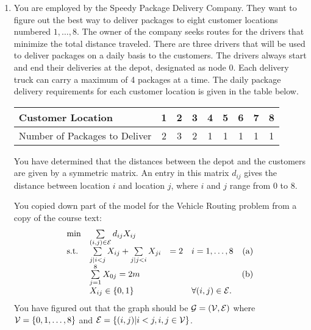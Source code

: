 \documentclass[12pt]{article}
\begin{document}
\begin{enumerate}
\begin{enumerate}
\vfill

%


\end{enumerate}

\newpage


\item

You are employed by the Speedy Package Delivery Company.  They want to figure out the best way to deliver packages to eight customer locations numbered $1,\ldots, 8$. The owner of the company seeks routes for the drivers that minimize the total distance traveled. There are three drivers that will be used to deliver packages on a daily basis to the customers. The drivers always start and end their deliveries at the depot, designated as node 0.  Each delivery truck can carry a maximum of 4 packages at a time. The daily package delivery requirements for each customer location is given in the table below.

\vspace{0.2 cm}
\begin{tabular}{l|c|c|c|c|c|c|c|c|}
Customer Location &  1	&	2	&	3	&	4	&
5	&	6	&	7	&	8	
\\
\hline
Number of Packages to Deliver &   2	&	3	&	2	&	1	&	1	&	1	&	1	&	1	
\end{tabular}
\vspace{0.2 cm}

You have determined that the distances between the depot and the customers are given by a symmetric matrix.  An entry in this matrix $d_{ij}$ 
gives the distance between location $i$ and location $j$, where $i$ and $j$ range from $0$ to $8$.

You copied down part of the model for the Vehicle Routing problem from a copy of the course text:
\[
\begin{array}{llllr}
  \min & \sum\limits_{(i,j) \in {\cal E}} d_{ij} X_{ij} & \\
\mbox{s.t.} & \sum\limits_{j | i < j} X_{ij} + \sum\limits_{j|j<i} X_{ji} & = 2 & i =
1,\ldots,8 & (\rm{a}) \\
&  \sum\limits_{j=1}^{8} X_{0j}  = 2m & & & (\rm{b}) \\
& X_{ij} \in \{0,1\} & & \forall (i,j) \in {\cal E}. &
\end{array}
\]
You have figured out that the graph should be ${\cal G} = ({\cal V},{\cal E})$ where ${\cal V}
= \{0,1,\ldots,8\}$ and ${\cal E} = \{ (i,j) | i < j, i,j \in {\cal V}\}$.  


\end{enumerate}
\end{document}
